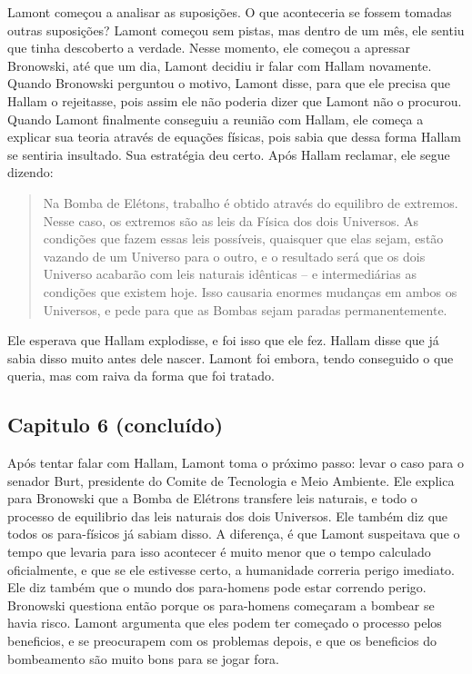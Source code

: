 \documentclass[14pt,portuguese]{extreport}
\begin{document}
    	  Lamont começou a analisar as suposições. O que aconteceria se fossem tomadas outras suposições? Lamont começou sem pistas, mas dentro de um mês, ele sentiu que tinha descoberto a verdade. Nesse momento, ele começou a apressar Bronowski, até que um dia, Lamont decidiu ir falar com Hallam novamente. Quando Bronowski perguntou o motivo, Lamont disse, para que ele precisa que Hallam o rejeitasse, pois assim ele não poderia dizer que Lamont não o procurou. Quando Lamont finalmente conseguiu a reunião com Hallam, ele começa a explicar sua teoria através de equações físicas, pois sabia que dessa forma Hallam se sentiria insultado. Sua estratégia deu certo. Após Hallam reclamar, ele segue dizendo:
        
        \begin{quotation}
      	  Na Bomba de Elétons, trabalho é obtido através do equilibro de extremos. Nesse caso, os extremos são as leis da Física dos dois Universos. As condições que fazem essas leis possíveis, quaisquer que elas sejam, estão vazando de um Universo para o outro, e o resultado será que os dois Universo acabarão com leis naturais idênticas – e intermediárias as condições que existem hoje. Isso causaria enormes mudanças em ambos os Universos, e pede para que as Bombas sejam paradas permanentemente.
        \end{quotation}

        Ele esperava que Hallam explodisse, e foi isso que ele fez. Hallam disse que já sabia disso muito antes dele nascer. Lamont foi embora, tendo conseguido o que queria, mas com raiva da forma que foi tratado.

      \subsection{Capitulo 6 (concluído)}

    	  Após tentar falar com Hallam, Lamont toma o próximo passo: levar o caso para o senador Burt, presidente do Comite de Tecnologia e Meio Ambiente. Ele explica para Bronowski que a Bomba de Elétrons transfere leis naturais, e todo o processo de equilibrio das leis naturais dos dois Universos. Ele também diz que todos os para-físicos já sabiam disso. A diferença, é que Lamont suspeitava que o tempo que levaria para isso acontecer é muito menor que o tempo calculado oficialmente, e que se ele estivesse certo, a humanidade correria perigo imediato. Ele diz também que o mundo dos para-homens pode estar correndo perigo. Bronowski questiona então porque os para-homens começaram a bombear se havia risco. Lamont argumenta que eles podem ter começado o processo pelos beneficios, e se preocurapem com os problemas depois, e que os beneficios do bombeamento são muito bons para se jogar fora.
    	
\end{document}
